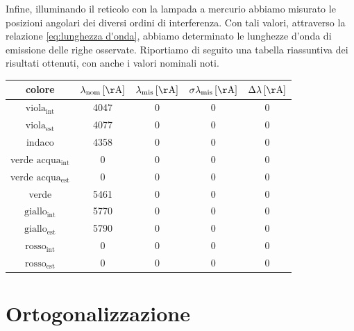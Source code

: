 \documentclass{article}
\begin{document}
        Infine, illuminando il reticolo con la lampada a mercurio abbiamo misurato le posizioni angolari dei diversi ordini di interferenza. 
        Con tali valori, attraverso la relazione \ref{eq:lunghezza d'onda}, abbiamo determinato le lunghezze d'onda di emissione delle righe osservate. 
        Riportiamo di seguito una tabella riassuntiva dei risultati ottenuti, con anche i valori nominali noti. \\  

        \begin{table}[H]
            \centering
            \begin{tabular}{|c|c|c|c|c|}
                \toprule 
                colore & 
                $ \lambda_{\mathrm{nom}} \, \mathrm{[\AA]} $ & 
                $ \lambda_{\mathrm{mis}} \, \mathrm{[\AA]} $ & 
                $ \sigma \lambda_{\mathrm{mis}} \, \mathrm{[\AA]}$ & 
                $ \Delta \lambda \, \mathrm{[\AA]} $ \\

                \midrule
                $ \mathrm{viola_{int}} $        & 4047 & 0 & 0 & 0 \\
                $ \mathrm{viola_{est}} $        & 4077 & 0 & 0 & 0 \\
                indaco                          & 4358 & 0 & 0 & 0 \\
                verde $ \mathrm{acqua_{int}} $  & 0 & 0 & 0 & 0 \\  
                verde $ \mathrm{acqua_{est}} $  & 0 & 0 & 0 & 0 \\
                verde                           & 5461 & 0 & 0 & 0 \\
                $ \mathrm{giallo_{int}} $       & 5770 & 0 & 0 & 0 \\
                $ \mathrm{giallo_{est}} $       & 5790 & 0 & 0 & 0 \\
                $ \mathrm{rosso_{int}} $        & 0 & 0 & 0 & 0 \\
                $ \mathrm{rosso_{est}} $        & 0 & 0 & 0 & 0 \\

                \bottomrule
            \end{tabular}
        \end{table}

        
    \section{Ortogonalizzazione}
\end{document}
